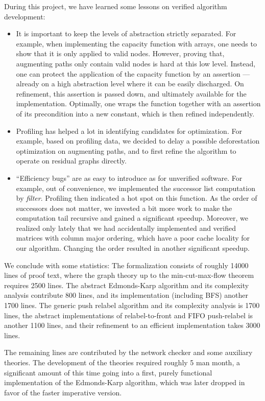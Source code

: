 \documentclass[smallcondensed]{svjour3}     %
\begin{document}
  During this project, we have learned some lessons on verified algorithm development: 
  \begin{itemize}
  \item It is important to keep the levels of abstraction strictly separated.
    For example, when implementing the capacity function with arrays, one needs to show that it is only applied to valid nodes.
    However, proving that, \eg augmenting paths only contain valid nodes is hard at this low level. 
    Instead, one can protect the application of the capacity function by an assertion --- already on a high abstraction level where it can be easily discharged. 
    On refinement, this assertion is passed down, and ultimately available for the implementation.
    Optimally, one wraps the function together with an assertion of its precondition into a new constant, which is then refined independently.
  \item Profiling has helped a lot in identifying candidates for optimization. For example, based on profiling data, we decided to delay a 
    possible deforestation optimization on augmenting paths, and to first refine the algorithm to operate on residual graphs directly.
  \item ``Efficiency bugs'' are as easy to introduce as for unverified software. For example, out of convenience, we implemented the successor list computation by
    \emph{filter}. Profiling then indicated a hot spot on this function. As the order of successors does not matter, we invested a bit more work to make the computation tail 
    recursive and gained a significant speedup. Moreover, we realized only lately that we had accidentally implemented and verified
    matrices with column major ordering, which have a poor cache locality for our algorithm. Changing the order resulted in another significant speedup.
  \end{itemize}
  
  We conclude with some statistics:
  The formalization consists of roughly 14000 lines of proof text, where the graph theory up to the min-cut-max-flow theorem requires 2500 lines.
  The abstract Edmonds-Karp algorithm and its complexity analysis contribute 800 lines, and its implementation (including BFS) another 1700 lines.
  The generic push relabel algorithm and its complexity analysis is 1700 lines, the abstract implementations of relabel-to-front and FIFO push-relabel is another 1100 lines,
  and their refinement to an efficient implementation takes 3000 lines.
  
  The remaining lines are contributed by the network checker and some auxiliary theories. The development of the theories required roughly 5 man month, a significant amount of this time going into a first, purely functional implementation of the Edmonds-Karp algorithm, which was later dropped in favor of the faster imperative version.
  
\end{document}
